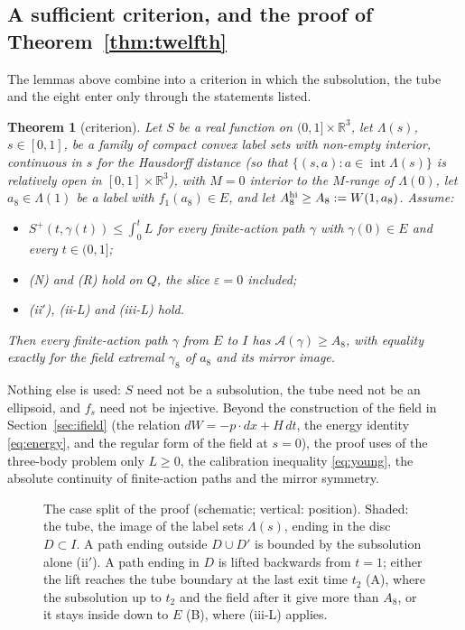 \documentclass[11pt]{article}
\newtheorem{theorem}{Theorem}
\theoremstyle{definition}
\begin{document}
\subsection{A sufficient criterion, and the proof of Theorem~\ref{thm:twelfth}}\label{sec:criterion}
The lemmas above combine into a criterion in which the subsolution, the tube and the eight enter only through the
statements listed.
\begin{theorem}[criterion]\label{thm:criterion}
Let $S$ be a real function on $(0,1]\times\mathbb R^3$, let $\Lambda(s)$, $s\in[0,1]$, be a family of compact convex
label sets with non-empty interior, continuous in $s$ for the Hausdorff distance (so that
$\{(s,a):a\in\operatorname{int}\Lambda(s)\}$ is relatively open in $[0,1]\times\mathbb R^3$), with $M=0$ interior to the
$M$-range of $\Lambda(0)$, let $a_8\in\Lambda(1)$ be a label with $f_1(a_8)\in E$,
and let $A_8^{\rm hi}\ge A_8:=W(1,a_8)$. Assume:
\begin{itemize}
\item[(S)] $S^+(t,\gamma(t))\le\int_0^tL$ for every finite-action path $\gamma$ with $\gamma(0)\in E$ and every $t\in(0,1]$;
\item[(F)] (N) and (R) hold on $Q$, the slice $\varepsilon=0$ included;
\item[(B)] (ii$'$), (ii-L) and (iii-L) hold.
\end{itemize}
Then every finite-action path $\gamma$ from $E$ to $I$ has $\mathcal A(\gamma)\ge A_8$, with equality exactly for the
field extremal $\gamma_8$ of $a_8$ and its mirror image.
\end{theorem}
Nothing else is used: $S$ need not be a subsolution, the tube need not be an ellipsoid, and $f_s$ need not be
injective. Beyond the construction of the field in Section~\ref{sec:ifield} (the relation $dW=-p\cdot dx+H\,dt$, the
energy identity \eqref{eq:energy}, and the regular form of the field at $s=0$), the proof uses of the three-body
problem only $L\ge0$, the calibration inequality \eqref{eq:young}, the absolute continuity of finite-action paths and
the mirror symmetry.
\begin{figure}[t]\centering
\figlogic
\caption{The case split of the proof (schematic; vertical: position). Shaded: the tube, the image of the label sets
$\Lambda(s)$, ending in the disc $D\subset I$. A path ending outside $D\cup D'$ is bounded by the subsolution alone
(ii$'$). A path ending in $D$ is lifted backwards from $t=1$; either the lift reaches the tube boundary at the last exit
time $t_2$ (A), where the subsolution up to $t_2$ and the field after it give more than $A_8$, or it stays inside
down to $E$ (B), where (iii-L) applies.}\label{fig:logic}
\end{figure}
\end{document}
